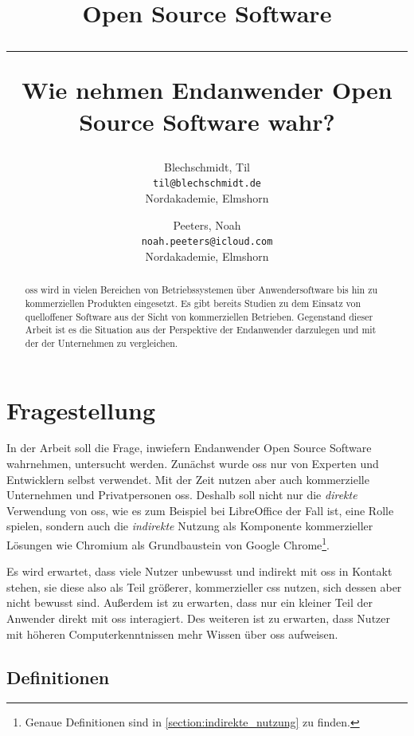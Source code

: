 \documentclass[a4paper]{article}
\title{Open Source Software \\
    \noindent\rule[0.25ex]{\linewidth}{0.5pt}
    \large Wie nehmen Endanwender Open Source Software wahr?
}
\author{
  Blechschmidt, Til\\
  \texttt{til@blechschmidt.de}\\
  Nordakademie, Elmshorn
  \and
  Peeters, Noah\\
  \texttt{noah.peeters@icloud.com}\\
  Nordakademie, Elmshorn
}
\begin{document}
    \thispagestyle{fancy}
    \maketitle

    \clearpage
    \begin{abstract}
         \gls{oss} wird in vielen Bereichen von Betriebssystemen über Anwendersoftware bis hin zu kommerziellen Produkten eingesetzt. Es gibt bereits Studien zu dem Einsatz von quelloffener Software aus der Sicht von kommerziellen Betrieben. Gegenstand dieser Arbeit ist es die Situation aus der Perspektive der Endanwender darzulegen und mit der der Unternehmen zu vergleichen.
    \end{abstract}
    \newpage

    \tableofcontents
    \listoffigures
    \listoftables
    \clearpage

    
    \glsresetall                
    \section{Fragestellung}\label{section:fragestellung}
        In der Arbeit soll die Frage, inwiefern Endanwender Open Source Software wahrnehmen, untersucht werden. 
        Zunächst wurde \gls{oss} nur von Experten und Entwicklern selbst verwendet. Mit der Zeit nutzen aber auch kommerzielle Unternehmen und Privatpersonen \gls{oss}\cite{oss:perception-adoption}.
        Deshalb soll nicht nur die \emph{direkte} Verwendung von \gls{oss}, wie es zum Beispiel bei LibreOffice der Fall ist, eine Rolle spielen, sondern auch die \emph{indirekte} Nutzung als Komponente kommerzieller Lösungen wie Chromium als Grundbaustein von Google Chrome\footnote{Genaue Definitionen sind in \ref{section:indirekte_nutzung} zu finden.}.
		
		Es wird erwartet, dass viele Nutzer unbewusst und indirekt mit \gls{oss} in Kontakt stehen, sie diese also als Teil größerer, kommerzieller \gls{css} nutzen, sich dessen aber nicht bewusst sind. Außerdem ist zu erwarten, dass nur ein kleiner Teil der Anwender direkt mit \gls{oss} interagiert\cite{oss:lotus-to-linux}. Des weiteren ist zu erwarten, dass Nutzer mit höheren Computerkenntnissen mehr Wissen über \gls{oss} aufweisen.

		\subsection{Definitionen}
\end{document}
